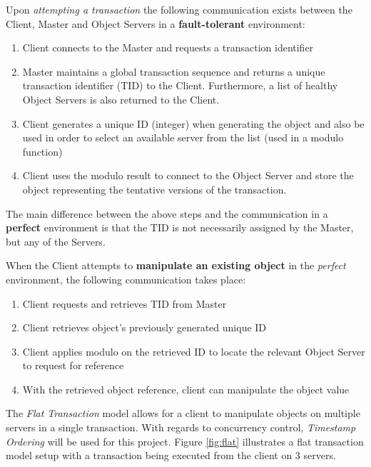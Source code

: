 \documentclass[times, 10pt,twocolumn]{article}
\begin{document}
Upon {\it attempting a transaction} the following communication exists between the Client, Master and Object Servers in a {\bf fault-tolerant} environment: 
\begin{enumerate}
\item Client connects to the Master and requests a transaction identifier 
\item Master maintains a global transaction sequence and returns a unique transaction identifier (TID) to the Client. Furthermore, a list of healthy Object Servers is also returned to the Client. 
\item Client generates a unique ID (integer) when generating the object and also be used in order to select an available server from the list (used in a modulo function)
\item Client uses the modulo result to connect to the Object Server and store the object representing the tentative versions of the transaction.
\end{enumerate}

The main difference between the above steps and the communication in a {\bf perfect} environment is that the TID is not necessarily assigned by the Master, but any of the Servers.

When the Client attempts to {\bf manipulate an existing object} in the {\it perfect} environment, the following communication takes place:
\begin{enumerate}
\item Client requests and retrieves TID from Master
\item Client retrieves object's previously generated unique ID
\item Client applies modulo on the retrieved ID to locate the relevant Object Server to request for reference
\item With the retrieved object reference, client can manipulate the object value
\end{enumerate}

\label{subsec:transmgt}
The {\it Flat Transaction} model allows for a client to manipulate objects on multiple servers in a single transaction. With regards to concurrency control, {\it Timestamp Ordering} will be used for this project. Figure \ref{fig:flat} illustrates a flat transaction model setup with a transaction being executed from the client on 3 servers.
\end{document}
